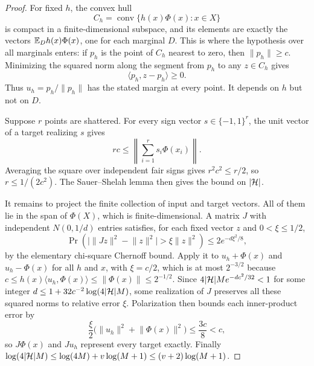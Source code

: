 \documentclass[11pt,letterpaper,pmlr,twoside]{jmlr}
\newcommand{\ip}[2]{\langle #1,#2\rangle}\newcommand{\norm}[1]{\lVert #1\rVert}
\begin{document}
\begin{proof}
For fixed $h$, the convex hull
\[
 C_h=\operatorname{conv}\{h(x)\Phi(x):x\in X\}
\]
is compact in a finite-dimensional subspace, and its elements are exactly the vectors $\mathbb E_Dh(x)\Phi(x)$, one for each marginal $D$. This is where the hypothesis over all marginals enters: if $p_h$ is the point of $C_h$ nearest to zero, then $\norm{p_h}\ge c$. Minimizing the squared norm along the segment from $p_h$ to any $z\in C_h$ gives
\[
 \ip{p_h}{z-p_h}\ge0.
\]
Thus $u_h=p_h/\norm{p_h}$ has the stated margin at every point. It depends on $h$ but not on $D$.

Suppose $r$ points are shattered. For every sign vector $s\in\{-1,1\}^r$, the unit vector of a target realizing $s$ gives
\[
 rc\le\left\|\sum_{i=1}^rs_i\Phi(x_i)\right\|.
\]
Averaging the square over independent fair signs gives $r^2c^2\le r/2$, so $r\le1/(2c^2)$. The Sauer--Shelah lemma then gives the bound on $|\mathcal H|$.

It remains to project the finite collection of input and target vectors. All of them lie in the span of $\Phi(X)$, which is finite-dimensional. A matrix $J$ with independent $N(0,1/d)$ entries satisfies, for each fixed vector $z$ and $0<\xi\le1/2$,
\[
 \Pr\left(\big|\norm{Jz}^2-\norm z^2\big|>\xi\norm z^2\right)
 \le2e^{-d\xi^2/8},
\]
by the elementary chi-square Chernoff bound. Apply it to $u_h+\Phi(x)$ and $u_h-\Phi(x)$ for all $h$ and $x$, with $\xi=c/2$, which is at most $2^{-3/2}$ because $c\le h(x)\ip{u_h}{\Phi(x)}\le\norm{\Phi(x)}\le2^{-1/2}$. Since $4|\mathcal H|Me^{-dc^2/32}<1$ for some integer $d\le1+32c^{-2}\log(4|\mathcal H|M)$, some realization of $J$ preserves all these squared norms to relative error $\xi$. Polarization then bounds each inner-product error by
\[
 \frac\xi2\bigl(\norm{u_h}^2+\norm{\Phi(x)}^2\bigr)
 \le\frac{3c}{8}<c,
\]
so $J\Phi(x)$ and $Ju_h$ represent every target exactly. Finally $\log(4|\mathcal H|M)\le\log(4M)+v\log(M+1)\le(v+2)\log(M+1)$.
\end{proof}
\end{document}
